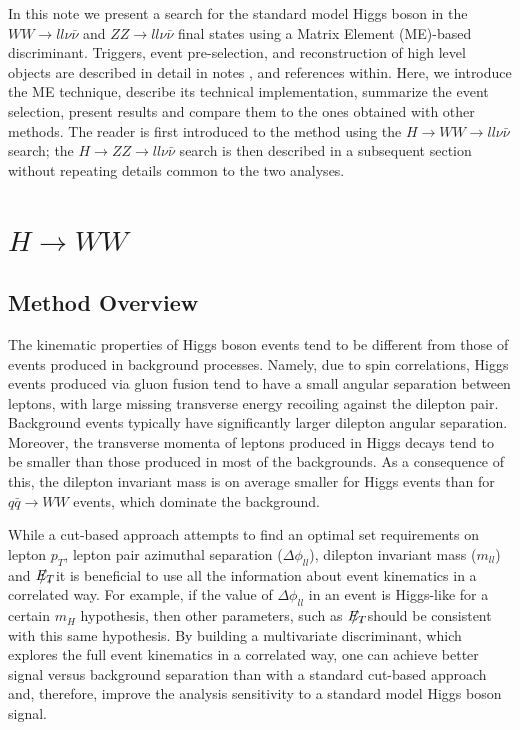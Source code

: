 \documentclass{cmspaper}
\newcommand{\met}{\mbox{$E_T\hspace{-1.1em}/$\hspace{0.7em}}}
\begin{document}
In this note we present a search for the standard model Higgs boson in the $WW \rightarrow ll\nu\bar{\nu}$ and $ZZ \rightarrow ll\nu\bar{\nu}$ final states 
using a Matrix Element (ME)-based discriminant. Triggers, event pre-selection, and reconstruction of high level objects are described 
in detail in notes \cite{ref:HWW2011smurf}, \cite{ref:HZZ2011smurf} and references within. Here, we introduce the ME technique, 
describe its technical implementation, summarize the event selection, present results and compare them to the ones obtained with 
other methods. The reader is first introduced to the method using the $H\rightarrow WW \rightarrow ll\nu\bar{\nu}$ search; the
$H \rightarrow ZZ \rightarrow ll\nu\bar{\nu}$ search is then described in a subsequent section without repeating details common to the two analyses.

\section{$H \rightarrow WW$ }
\subsection{Method Overview}
\label{sec:Meth_Overview}
The kinematic properties of Higgs boson events tend to be different from those of events produced in background processes.
Namely, due to spin correlations, Higgs events produced via gluon fusion tend to have a small angular separation between 
leptons, with large missing transverse energy recoiling against the dilepton pair. Background events typically have significantly
larger dilepton angular separation.  Moreover,  the transverse momenta of leptons produced in Higgs decays tend to be smaller
than those produced in most of the backgrounds. As a consequence of this, the dilepton invariant mass is on average smaller for Higgs events
than for $q\bar{q} \rightarrow WW$ events, which dominate the background.

While a cut-based approach attempts to find an optimal set requirements on lepton $p_{T}$, lepton pair azimuthal separation ($\Delta\phi_{ll}$), 
dilepton invariant mass  ($m_{ll}$) and \met, it is beneficial to use all the information about event kinematics in a correlated way. 
For example, if the value of $\Delta\phi_{ll}$ in an event is Higgs-like for a certain $m_{H}$ hypothesis, then other parameters, such as  
\met, should be consistent with this same hypothesis. By building a multivariate discriminant, which explores the full event kinematics
in a correlated way, one can achieve better signal versus background separation than with a standard cut-based approach and, 
therefore, improve the analysis sensitivity to a standard model Higgs boson signal.
\end{document}
